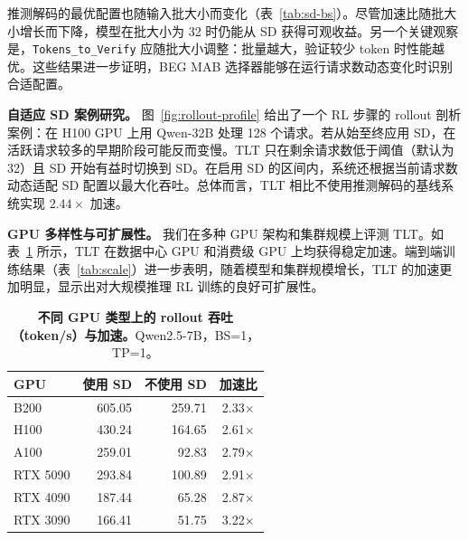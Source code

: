 \documentclass[10pt,twocolumn]{article}
\newcommand{\SysName}{\textrm{TLT}\xspace}
\begin{document}
\begin{table}[t]
\centering\small
\caption{\textbf{\texttt{topK} 对推测解码的影响。}Qwen-32B，H100（TP=4），\texttt{Draft\_Depth=12}、\texttt{Tokens\_to\_Verify=64}。}
\label{tab:topk}
\end{table}

推测解码的最优配置也随输入批大小而变化（表~\ref{tab:sd-bs}）。尽管加速比随批大小增长而下降，模型在批大小为 32 时仍能从 SD 获得可观收益。另一个关键观察是，\texttt{Tokens\_to\_Verify} 应随批大小调整：批量越大，验证较少 token 时性能越优。这些结果进一步证明，BEG MAB 选择器能够在运行请求数动态变化时识别合适配置。

\noindent\textbf{自适应 SD 案例研究。}
图~\ref{fig:rollout-profile} 给出了一个 RL 步骤的 rollout 剖析案例：在 H100 GPU 上用 Qwen-32B 处理 128 个请求。若从始至终应用 SD，在活跃请求较多的早期阶段可能反而变慢。\SysName 只在剩余请求数低于阈值（默认为 32）且 SD 开始有益时切换到 SD。在启用 SD 的区间内，系统还根据当前请求数动态适配 SD 配置以最大化吞吐。总体而言，\SysName 相比不使用推测解码的基线系统实现 $2.44\times$ 加速。

\noindent\textbf{GPU 多样性与可扩展性。}
我们在多种 GPU 架构和集群规模上评测 \SysName。如表~\ref{tab:gpu} 所示，\SysName 在数据中心 GPU 和消费级 GPU 上均获得稳定加速。端到端训练结果（表~\ref{tab:scale}）进一步表明，随着模型和集群规模增长，\SysName 的加速更加明显，显示出对大规模推理 RL 训练的良好可扩展性。

\begin{table}[t]
\centering\small
\caption{\textbf{不同 GPU 类型上的 rollout 吞吐（token/s）与加速。}Qwen2.5-7B，BS=1，TP=1。}
\label{tab:gpu}
\begin{tabular}{lrrc}
\toprule
GPU & 使用 SD & 不使用 SD & 加速比 \\
\midrule
B200 & 605.05 & 259.71 & 2.33$\times$ \\
H100 & 430.24 & 164.65 & 2.61$\times$ \\
A100 & 259.01 & 92.83 & 2.79$\times$ \\
RTX 5090 & 293.84 & 100.89 & 2.91$\times$ \\
RTX 4090 & 187.44 & 65.28 & 2.87$\times$ \\
RTX 3090 & 166.41 & 51.75 & 3.22$\times$ \\
\bottomrule
\end{tabular}
\end{table}
\end{document}
